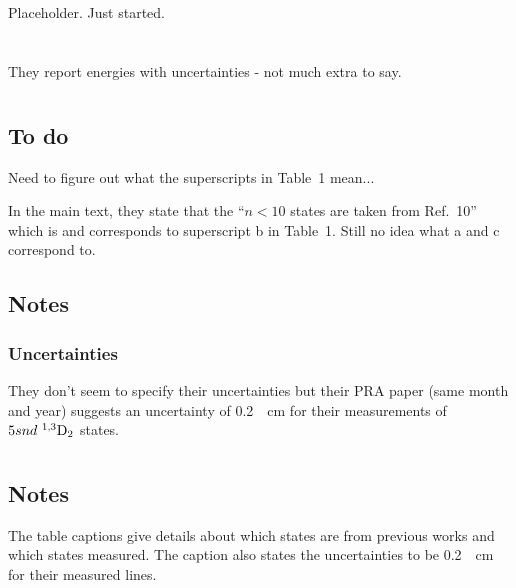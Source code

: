 \documentclass{article}
\newcommand{\tsup}{\textsuperscript}													%
\newcommand{\tsub}{\textsubscript}														%
\newcommand{\SLJ}[3]{\tsup{#1}\textnormal{#2}\tsub{#3}}
\newcommand{\nSLJ}[4]{{#1}\textnormal{ }\SLJ{#2}{#3}{#4}}
\begin{document}
\section{}

Placeholder. Just started.

\section{}

They report energies with uncertainties - not much extra to say.

\section{}

\subsection{To do}

Need to figure out what the superscripts in Table~1 mean...

In the main text, they state that the ``${n < 10}$ states are taken from Ref.~10'' which is \cite{moo_1952v2} and corresponds to superscript b in Table~1. Still no idea what a and c correspond to.

\subsection{Notes}

\subsubsection{Uncertainties}

They don't seem to specify their uncertainties but their PRA paper \cite{daz_1995} (same month and year) suggests an uncertainty of \SI{0.2}{\per\cm} for their measurements of $\nSLJ{5snd}{1,3}{D}{2}$ states. 

\section{}

\subsection{Notes}

The table captions give details about which states are from previous works and which states \citeauthor{dai_1995} measured. The caption also states the uncertainties to be \SI{0.2}{\per\cm} for their measured lines.
\end{document}
